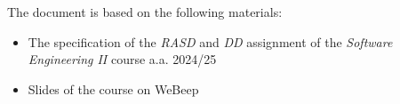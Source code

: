 The document is based on the following materials:

\begin{itemize}
    \item The specification of the \textit{RASD} and \textit{DD} assignment of the
    \textit{Software Engineering II} course a.a. 2024/25
    \item Slides of the course on WeBeep
\end{itemize}
